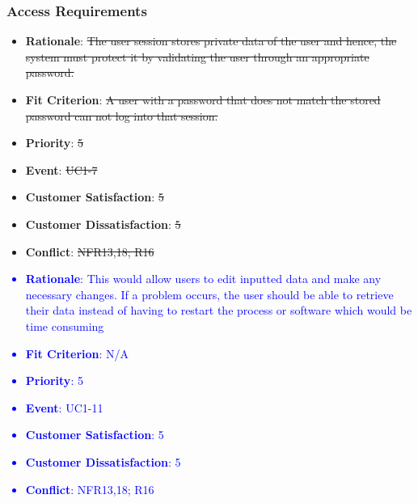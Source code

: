 \documentclass[12pt, titlepage]{article}
\newcounter{reqnum} %
\newcounter{freqnum} %
\begin{document}
\begin{itemize}
\subsubsection{Access Requirements}
\item[\sout{NFR17}
\label{NFR}:] 
\begin{itemize}
    \item \textbf{Rationale}: \sout{The user session stores private data of the user and hence, the system must protect it by validating the user through an appropriate password.}
    \item \textbf{Fit Criterion}: \sout{A user with a password that does not match the stored password can not log into that session.}
    \item \textbf{Priority}: \sout{5}
    \item \textbf{Event}: \sout{UC1-7}%
    \item \textbf{Customer Satisfaction}: \sout{5}
    \item \textbf{Customer Dissatisfaction}: \sout{5}
    \item \textbf{Conflict}: \sout{NFR13,18; R16}
\end{itemize}
\textcolor{blue}{
\item[NFR\refstepcounter{freqnum}\thefreqnum
\label{NFR}:] 
\begin{itemize}
    \item \textbf{Rationale}: This would allow users to edit inputted data and make any necessary changes. If a problem occurs, the user should be able to retrieve their data instead of having to restart the process or software which would be time consuming
    \item \textbf{Fit Criterion}: N/A
    \item \textbf{Priority}: 5
    \item \textbf{Event}: UC1-11%
    \item \textbf{Customer Satisfaction}: 5
    \item \textbf{Customer Dissatisfaction}: 5
    \item \textbf{Conflict}: NFR13,18; R16
\end{itemize}
}
\textcolor{blue}{
\item[NFR\refstepcounter{freqnum}\thefreqnum
\label{NFR}:] 
}
\end{itemize}
\end{document}
